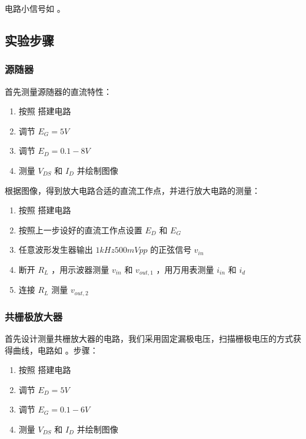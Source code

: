 \documentclass[lang=cn,11pt,a4paper,cite=authoryear]{elegantpaper}
\begin{document}
电路小信号如  。


\subsection{实验步骤}

\subsubsection{源随器}

首先测量源随器的直流特性： 

\begin{enumerate}
    \item 按照  搭建电路
    \item 调节 \(E_G = 5 V\) 
    \item 调节 \(E_D = 0.1 - 8 V\) 
    \item 测量 \(V_{DS}\) 和 \(I_D\) 并绘制图像
\end{enumerate}


根据图像，得到放大电路合适的直流工作点，并进行放大电路的测量：

\begin{enumerate}
    \item 按照  搭建电路
    \item 按照上一步设好的直流工作点设置 \(E_D\) 和 \(E_G\) 
    \item 任意波形发生器输出 \(1 kHz 500 m Vpp\)  的正弦信号 \(v_{in}\) 
    \item 断开 \(R_L\) ，用示波器测量 \(v_{in}\) 和 \(v_{out,1}\) ，用万用表测量 \(i_{in}\) 和 \(i_d\) 
    \item 连接 \(R_L\) 测量 \(v_{out,2}\)
\end{enumerate}



\subsubsection{共栅极放大器}

首先设计测量共栅放大器的电路，我们采用固定漏极电压，扫描栅极电压的方式获得曲线，电路如  。步骤：



\begin{enumerate}
    \item 按照  搭建电路
    \item 调节 \(E_D = 5 V\) 
    \item 调节 \(E_G = 0.1 - 6 V\) 
    \item 测量 \(V_{DS}\) 和 \(I_D\) 并绘制图像
\end{enumerate}
\end{document}
